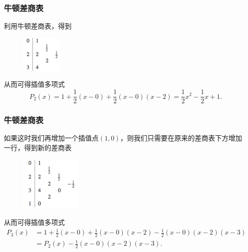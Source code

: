 \documentclass[10pt]{beamer}
\begin{document}
\begin{frame}
\frametitle{牛顿差商表}
利用牛顿差商表，得到
\begin{figure}
\includegraphics[width=2cm]{figs/3-1-2_Newton-2} 
\end{figure}
从而可得插值多项式
\begin{equation}
P_2(x) = 1 + \frac{1}{2}(x-0) + \frac{1}{2}(x-0)(x-2) =  \frac{1}{2} x^2 - \frac{1}{2} x + 1.
\end{equation}
\end{frame}


\begin{frame}
\frametitle{牛顿差商表}
如果这时我们再增加一个插值点$(1,0)$，则我们只需要在原来的差商表下方增加一行，得到新的差商表
\begin{figure}
\includegraphics[width=3cm]{figs/3-1-2_Newton-3} 
\end{figure}
从而可得插值多项式
\begin{align}
P_3(x) & = 1 + \frac{1}{2}(x-0) + \frac{1}{2}(x-0)(x-2) - \frac{1}{2}(x-0)(x-2)(x-3) \nonumber \\
           & =  P_2(x) - \frac{1}{2}(x-0)(x-2)(x-3).
\end{align}
\end{frame}
\end{document}
